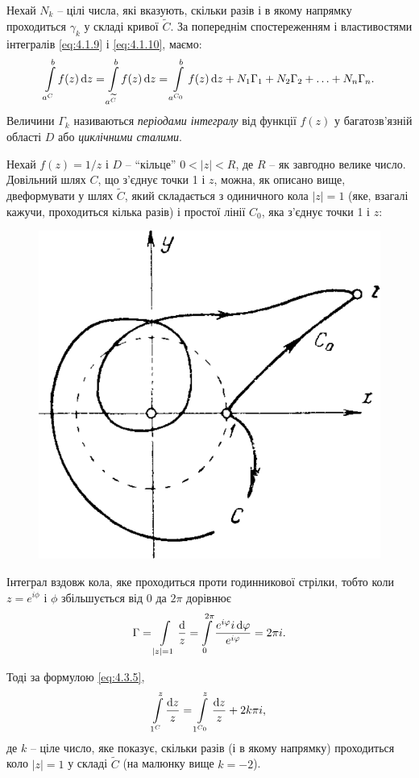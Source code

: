 Нехай $N_k$ -- цілі числа, які вказують, скільки разів і в якому напрямку проходиться $\gamma_k$ у складі кривої $\widetilde{C}$. За попереднім спостереженням і властивостями інтегралів \eqref{eq:4.1.9} і \eqref{eq:4.1.10}, маємо:
\begin{equation}
	\label{eq:4.3.5}
	\displaystyle\int\limits_{a^C}^b f(z) \mathop{}\!\mathrm{d} z = \displaystyle\int\limits_{a^{\widetilde{C}}}^b f(z) \mathop{}\!\mathrm{d} z = \displaystyle\int\limits_{a^{C_0}}^b f(z) \mathop{}\!\mathrm{d} z + N_1 \Gamma_1 + N_2 \Gamma_2 + \ldots + N_n \Gamma_n.
\end{equation}
Величини $\Gamma_k$ називаються \textit{періодами інтегралу} від функції $f(z)$ у багатозв'язній області $D$ або \textit{циклічними сталими}. \\
\begin{example}
	Нехай $f(z) = 1 /z$ і $D$ -- ``кільце'' $0 < |z| < R$, де $R$ -- як завгодно велике число. Довільний шлях $C$, що з'єднує точки 1 і $z$, можна, як описано вище, двеформувати у шлях $\tilde C$, який складається з одиничного кола $|z|=1$ (яке, взагалі кажучи, проходиться кілька разів) і простої лінії $C_0$, яка з'єднує точки 1 і $z$:
	\begin{figure}[H]
		\centering
		\includegraphics[width=.4\linewidth]{mal-22.png}
	\end{figure}

	Інтеграл вздовж кола, яке проходиться проти годинникової стрілки, тобто коли $z = e^{i \phi}$ і $\phi$ збільшується від $0$ да $2\pi$ дорівнює
	\begin{equation}
		\label{eq:4.3.6}
		\Gamma = \displaystyle\int\limits_{|z|=1} \frac{\mathop{}\!\mathrm{d}}{z} = \displaystyle\int\limits_0^{2\pi} \frac{e^{i\varphi}i\mathop{}\!\mathrm{d}\varphi}{e^{i\varphi}}=2\pi i.
	\end{equation}

	Тоді за формулою \eqref{eq:4.3.5},
	\begin{equation}
		\label{eq:4.3.7}
		\displaystyle\int\limits_{1^C}^z \frac{\mathop{}\!\mathrm{d} z}{z} = \displaystyle\int\limits_{1^{C_0}}^z \frac{\mathop{}\!\mathrm{d} z}{z} + 2 k \pi i,
	\end{equation}
	де $k$ -- ціле число, яке показує, скільки разів (і в якому напрямку) проходиться коло $|z|=1$ у складі $\tilde C$ (на малюнку вище $k=-2$). \\


\end{example}
